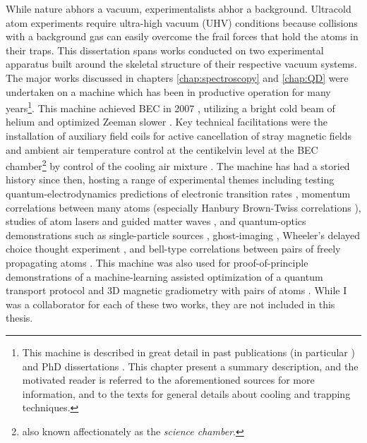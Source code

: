 	While nature abhors a vacuum, experimentalists abhor a background.
	Ultracold atom experiments require ultra-high vacuum (UHV) conditions because collisions with a background gas can easily overcome the frail forces that hold the atoms in their traps.
	This dissertation spans works conducted on two experimental apparatus built around the skeletal structure of their respective vacuum systems.
	The major works discussed in chapters \ref{chap:spectroscopy} and \ref{chap:QD} were undertaken on a machine which has been in productive operation for many years\footnote{This machine is described in great detail in past publications (in particular \cite{Swansson04,Dall07}) and PhD dissertations \cite{Hodgmanthesis,Manningthesis,Shinthesis,Dallthesis}.
	This chapter present a summary description, and the motivated reader is referred to the aforementioned sources for more information, and to the texts \cite{FootAtomic,MetVdS} for general details about cooling and trapping techniques.}.
	This machine achieved BEC in 2007 \cite{Dall07}, utilizing a bright cold beam of helium \cite{Swansson04} and optimized Zeeman slower \cite{Dedman04}.
	Key technical facilitations were the installation of auxiliary field coils for active cancellation of stray magnetic fields \cite{Dedman04} and ambient air temperature control at the centikelvin level at the BEC chamber\footnote{also known affectionately as the \emph{science chamber}.} by control of the cooling air mixture \cite{Dedman15}.
	The machine has had a storied history since then, hosting a range of experimental themes including testing quantum-electrodynamics predictions of electronic transition rates \cite{Dall08}, momentum correlations between many atoms \cite{Hodgman17,Dall13,Manning13} (especially Hanbury Brown-Twiss correlations \cite{Manning10,Dall11a,Hodgman11,Rugway11,Rugway13}), studies of atom lasers \cite{Dall07,Dall08a,Henson18,Manning10} and guided matter waves \cite{Dall10, Dall11a,Dall11}, and quantum-optics demonstrations such as single-particle sources \cite{Manning14}, ghost-imaging \cite{Khakimov16,Hodgman19}, Wheeler's delayed choice thought experiment \cite{Manning15}, and bell-type correlations between pairs of freely propagating atoms \cite{Shin19}.
	This machine was also used for proof-of-principle demonstrations of a machine-learning assisted optimization of a quantum transport protocol \cite{Henson18ML} and 3D magnetic gradiometry with pairs of atoms \cite{Shin20}.
	While I was a collaborator for each of these two works, they are not included in this thesis.

